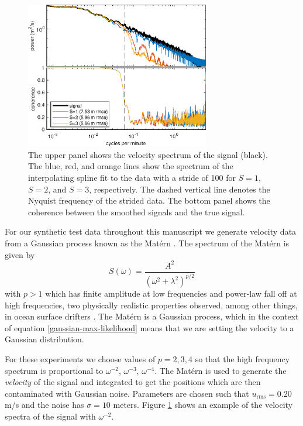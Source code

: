 \documentclass[10pt,journal]{IEEEtran}
\begin{document}
\begin{figure}
  \centerline{\includegraphics[width=19pc,angle=0]{figures/interpolation_spectrum_slope2degreeVaried}}
  
  \caption{The upper panel shows the velocity spectrum of the signal (black). The blue, red, and orange lines show the spectrum of the interpolating spline fit to the data with a stride of 100 for $S=1$, $S=2$, and $S=3$, respectively. The dashed vertical line denotes the Nyquist frequency of the strided data. The bottom panel shows the coherence between the smoothed signals and the true signal.}
  \label{varied_slope}
\end{figure}

For our synthetic test data throughout this manuscript we generate velocity data from a Gaussian process known as the Mat\'ern \cite{lilly2017-npg}. The spectrum of the Mat\'ern is given by
\begin{equation}
S(\omega) = \frac{A^2}{(\omega^2 + \lambda^2)^{p/2}}
\end{equation}
with $p>1$ which has finite amplitude at low frequencies and power-law fall off at high frequencies, two physically realistic properties observed, among other things, in ocean surface drifters \cite{sykulski2016-jrssc}. The Mat\'ern is a Gaussian process, which in the context of equation \ref{gaussian-max-likelihood} means that we are setting the velocity to a Gaussian distribution.

For these experiments we choose values of $p=2,3,4$ so that the high frequency spectrum is proportional to $\omega^{-2}$, $\omega^{-3}$, $\omega^{-4}$. The Mat\'ern is used to generate the \emph{velocity} of the signal and integrated to get the positions which are then contaminated with Gaussian noise. Parameters are chosen such that $u_{\textrm{rms}}=0.20$ m/s and the noise has $\sigma=10$ meters. Figure \ref{varied_slope} shows an example of the velocity spectra of the signal with $\omega^{-2}$.
\end{document}
